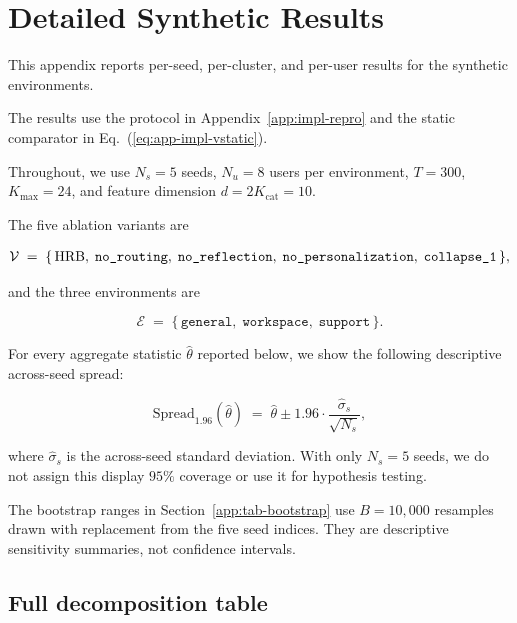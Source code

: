 \documentclass{article} %
\renewcommand{\eqref}[1]{\textup{(\ref{#1})}}
\begin{document}
\section{Detailed Synthetic Results}

\label{app:tables}

This appendix reports per-seed, per-cluster, and per-user results for the synthetic environments.

The results use the protocol in Appendix~\ref{app:impl-repro} and the static comparator in Eq.~\eqref{eq:app-impl-vstatic}.

Throughout, we use \(N_s=5\) seeds, \(N_u=8\) users per environment, \(T=300\),
\(K_{\max}=24\), and feature dimension \(d=2K_{\mathrm{cat}}=10\).

The five ablation variants are

\begin{equation}
\label{eq:app-tab-variants}
\begin{aligned}
\mathcal{V} \;=\; \{\,\textnormal{HRB},\; \texttt{no\_routing},\; \texttt{no\_reflection},\; \texttt{no\_personalization},\; \texttt{collapse\_1}\,\},
\end{aligned}
\end{equation}

and the three environments are

\begin{equation}
\label{eq:app-tab-envs}
\mathcal{E} \;=\; \{\,\texttt{general},\; \texttt{workspace},\; \texttt{support}\,\}.
\end{equation}

For every aggregate statistic \(\widehat\theta\) reported below, we show the
following descriptive across-seed spread:

\begin{equation}
\label{eq:app-tab-spread}
\mathrm{Spread}_{1.96}(\widehat\theta)
\;=\;
\widehat\theta \pm 1.96\cdot \frac{\widehat\sigma_s}{\sqrt{N_s}},
\end{equation}

where \(\widehat\sigma_s\) is the across-seed standard deviation. With only
\(N_s=5\) seeds, we do not assign this display \(95\%\) coverage or use it for
hypothesis testing.

The bootstrap ranges in Section~\ref{app:tab-bootstrap} use \(B=10{,}000\)
resamples drawn with replacement from the five seed indices. They are
descriptive sensitivity summaries, not confidence intervals.

\subsection{Full decomposition table}
\end{document}
